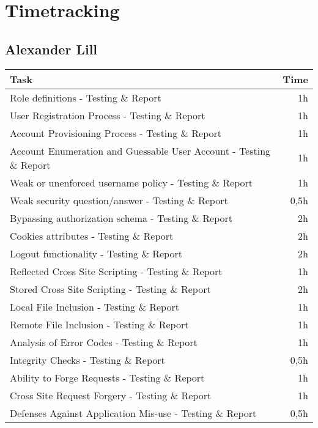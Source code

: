 \chapter{Timetracking}\label{chapter:timetracking}
\section*{Alexander Lill}
\begin{table}[h!tpb]
  \centering
  \begin{tabularx}{\textwidth}{X r}
    \toprule
      Task & Time \\
    \midrule
    Role definitions - Testing \& Report & 1h \\
    User Registration Process - Testing \& Report & 1h \\
    Account Provisioning Process - Testing \& Report & 1h \\
    Account Enumeration and Guessable User Account - Testing \& Report & 1h \\
    Weak or unenforced username policy - Testing \& Report & 1h \\
    Weak security question/answer - Testing \& Report & 0,5h \\
    Bypassing authorization schema - Testing \& Report & 2h \\
    Cookies attributes - Testing \& Report & 2h \\
    Logout functionality - Testing \& Report & 2h \\
    Reflected Cross Site Scripting - Testing \& Report & 1h \\
    Stored Cross Site Scripting - Testing \& Report & 2h \\
    Local File Inclusion - Testing \& Report & 1h \\
    Remote File Inclusion - Testing \& Report & 1h \\
    Analysis of Error Codes - Testing \& Report & 1h \\
    Integrity Checks - Testing \& Report & 0,5h \\
    Ability to Forge Requests - Testing \& Report & 1h \\
    Cross Site Request Forgery - Testing \& Report & 1h \\
    Defenses Against Application Mis-use - Testing \& Report & 0,5h \\

\end{tabularx}
\end{table}
